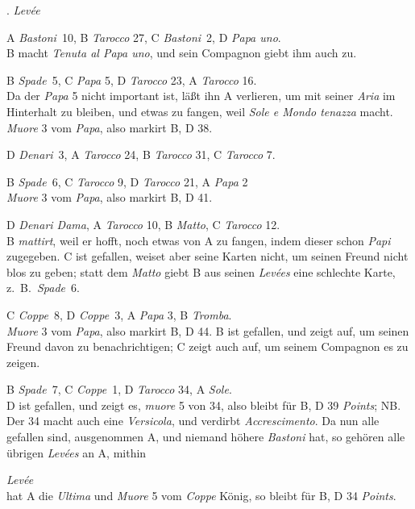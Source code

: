 \documentclass[11pt,a6paper,twoside]{article}
\newcounter{leveescnt}
\newenvironment{leveeslist}{
  \begin{list}
    {\arabic{leveescnt}. {\textit{Levée}}}
    {\usecounter{leveescnt}
      \setlength{\labelwidth}{2em}
      \setlength{\labelsep}{1em}
      \setlength{\itemsep}{0pt}
      \setlength{\parsep}{0pt}
      \setlength{\leftmargin}{1.5em}
      \setlength{\itemindent}{1em} %
    }
}{\end{list}}
\begin{document}
\begin{leveeslist}
\item A \textit{Bastoni}~10, B \textit{Tarocco} 27, C \textit{Bastoni}~2, D \textit{Papa uno}. \\B macht \textit{Tenuta al Papa uno}, und sein Compagnon giebt ihm auch zu.
\item B \textit{Spade}~5, C \textit{Papa} 5, D \textit{Tarocco} 23, A \textit{Tarocco} 16. \\Da der \textit{Papa} 5 nicht important ist, läßt ihn A verlieren, um mit seiner \textit{Aria} im Hinterhalt zu bleiben, und etwas zu fangen, weil \textit{Sole e Mondo tenazza} macht. \textit{Muore} 3 vom \textit{Papa}, also markirt B, D 38.
\item D \textit{Denari}~3, A \textit{Tarocco} 24, B \textit{Tarocco} 31, C \textit{Tarocco} 7.
\item B \textit{Spade}~6, C \textit{Tarocco} 9, D \textit{Tarocco} 21, A \textit{Papa} 2 \\\textit{Muore} 3 vom \textit{Papa}, also markirt B, D 41.
\item D \textit{Denari Dama}, A \textit{Tarocco} 10, B \textit{Matto}, C \textit{Tarocco} 12. \\B \textit{mattirt}, weil er hofft, noch etwas von A zu fangen, indem dieser schon \textit{Papi} zugegeben. C ist gefallen, weiset aber seine Karten nicht, um seinen Freund nicht blos zu geben; statt dem \textit{Matto} giebt B aus seinen \textit{Levées} eine schlechte Karte, z.\ B.\ \textit{Spade}~6.
\item C \textit{Coppe}~8, D \textit{Coppe}~3, A \textit{Papa} 3, B \textit{Tromba}. \\\textit{Muore} 3 vom \textit{Papa}, also markirt B, D 44. B ist gefallen, und zeigt auf, um seinen Freund davon zu benachrichtigen; C zeigt auch auf, um seinem Compagnon es zu zeigen.
\item B \textit{Spade}~7, C \textit{Coppe}~1, D \textit{Tarocco} 34, A \textit{Sole}. \\D ist gefallen, und zeigt es, \textit{muore} 5 von 34, also bleibt für B, D 39 \textit{Points}; NB. Der 34 macht auch eine \textit{Versicola}, und verdirbt \textit{Accrescimento}.
Da nun alle gefallen sind, ausgenommen A, und niemand höhere \textit{Bastoni} hat, so gehören alle übrigen \textit{Levées} an A, mithin
\item[\lower 16pt\hbox{\valign{&\hbox{\hsize=1em {#\vspace{4pt}}\hfil}\cr 19.& 20.& 21.\cr}} \textit{Levée}]\-\\ hat A die \textit{Ultima} und \textit{Muore} 5 vom \textit{Coppe} König, so bleibt für B, D 34 \textit{Points}.
\end{leveeslist}
\end{document}

